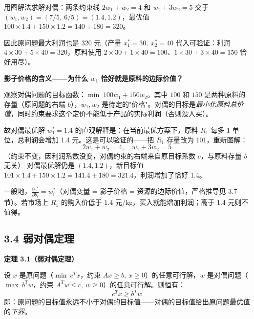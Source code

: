{用图解法求解对偶：两条约束线 $2w_1+w_2=4$ 和 $w_1+3w_2=5$ 交于 $(w_1,w_2)=(7/5,\ 6/5)=(1.4,1.2)$，最优值 $100\times1.4+150\times1.2=140+180=320$。

因此原问题最大利润也是 320 元（产量 $x_1^*=30,\ x_2^*=40$ 代入可验证：利润 $4\times30+5\times40=320$，原料使用 $2\times30+1\times40=100$、$1\times30+3\times40=150$ 恰好用尽）。

\medskip
\textbf{影子价格的含义——为什么 $w_1$ 恰好就是原料的边际价值？}

观察对偶问题的目标函数：$\min\; 100w_1 + 150w_2$。其中 $100$ 和 $150$ 是两种原料的存量（原问题的右端 $b$），$w_1,w_2$ 是待定的"价格"。对偶的目标是\emph{最小化原料总价值}，同时约束要求这个定价不能低于产品的实际利润（否则没人买）。

故对偶最优解 $w_1^*=1.4$ 的直观解释是：在当前最优方案下，原料 $R_1$ 每多 1 单位，总利润会增加 1.4 元。这是可以验证的——把 $R_1$ 存量改为 101，重新图解：
\[
2w_1+w_2=4,\quad w_1+3w_2=5
\]
（约束不变，因利润系数没变，对偶约束的右端来自原目标系数 $c$，与原料存量 $b$ 无关）
对偶最优解仍是 $(1.4,1.2)$，新目标值 $101\times1.4+150\times1.2=141.4+180=321.4$，利润增加了恰好 1.4。

一般地，$\frac{\partial z^*}{\partial b_i} = w_i^*$（对偶变量 = 影子价格 = 资源的边际价值，严格推导见 3.7 节）。若市场上 $R_1$ 的购入价低于 1.4 元/kg，买入就能增加利润；高于 1.4 元则不值得。}

\subsection{3.4 弱对偶定理}

\begin{defbox}
\textbf{定理 3.1（弱对偶定理）}

设 $x$ 是原问题（$\min\ c^T x$，约束 $Ax\ge b,\ x\ge 0$）的任意可行解，$w$ 是对偶问题（$\max\ b^T w$，约束 $A^T w\le c,\ w\ge 0$）的任意可行解。则恒有：
\[
c^T x \ge b^T w
\]
即：原问题的目标值永远不小于对偶的目标值——对偶的目标值给出原问题最优值的\emph{下界}。
\end{defbox}

\medskip
{}

